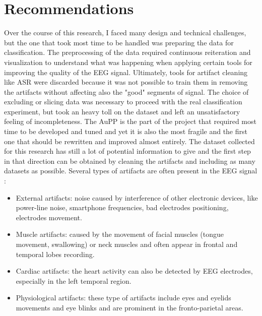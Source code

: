 \section{Recommendations}
\label{sec:recommendations}
Over the course of this research, I faced many design and technical challenges, but the one that took most time to be handled was preparing the data for classification. The preprocessing of the data required continuous reiteration and visualization to understand what was happening when applying certain tools for improving the quality of the \ac{EEG} signal. Ultimately, tools for artifact cleaning like \ac{ASR} were discarded because it was not possible to train them in removing the artifacts without affecting also the "good" segments of signal. The choice of excluding or slicing data was necessary to proceed with the real classification experiment, but took an heavy toll on the dataset and left an unsatisfactory feeling of incompleteness. The \ac{AuPP} is the part of the project that required most time to be developed and tuned and yet it is also the most fragile and the first one that should be rewritten and improved almost entirely. The dataset collected for this research has still a lot of potential information to give and the first step in that direction can be obtained by cleaning the artifacts and including as many datasets as possible. Several types of artifacts are often present in the \ac{EEG} signal \cite{tandle_classification_nodate}:
\begin{itemize}
\item External artifacts: noise caused by interference of other electronic devices, like power-line noise, smartphone frequencies, bad electrodes positioning, electrodes movement.
\item Muscle artifacts: caused by the movement of facial muscles (tongue movement, swallowing) or neck muscles and often appear in frontal and temporal lobes recording.
\item Cardiac artifacts: the heart activity can also be detected by \ac{EEG} electrodes, especially in the left temporal region.
\item Physiological artifacts: these type of artifacts include eyes and eyelids movements and eye blinks and are prominent in the fronto-parietal areas.
\end{itemize}
